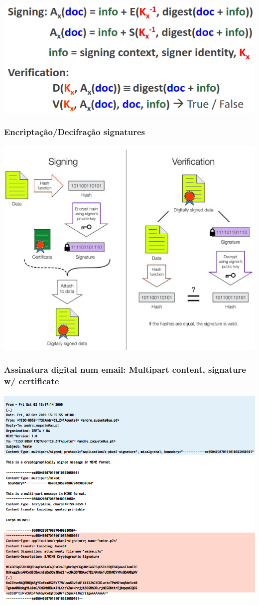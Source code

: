 \documentclass{article}
\begin{document}
\begin{center}
  \includegraphics[scale=0.4]{11}
\end{center}

\subsubsection{Encriptação/Decifração signatures}

\begin{center}
  \includegraphics[scale=0.5]{12}
\end{center}

\pagebreak

\subsubsection{Assinatura digital num email: Multipart content, signature w/ certificate}

\begin{center}
  \includegraphics[scale=0.5]{13}
\end{center}
\end{document}
